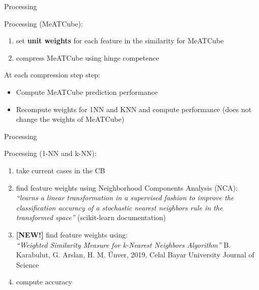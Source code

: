 \documentclass[]{beamer}
\begin{document}
\begin{frame}{Processing}

    Processing (MeATCube):\begin{enumerate}
        \item set \textbf{unit weights} for each feature in the similarity for MeATCube
        \item compress MeATCube using hinge competence
    \end{enumerate}

    At each compression step step:
    \begin{itemize}
        \item Compute MeATCube prediction performance
        \item Recompute weights for 1NN and KNN and compute performance (does not change the weights of MeATCube)
    \end{itemize}

\end{frame}
\begin{frame}{Processing}

    Processing (1-NN and k-NN):\begin{enumerate}
        \item take current cases in the CB
        \item find feature weights using Neighborhood Components Analysis (NCA):\\
        \textit{``learns a linear transformation in a supervised fashion to improve the classification accuracy of a stochastic nearest neighbors rule in the transformed space''} (scikit-learn documentation)
        \item \textbf{[NEW!]} find feature weights using:\\
        \textit{``Weighted Similarity Measure for k-Nearest Neighbors Algorithm''}
        B. Karabulut, G. Arslan, H. M. Ünver, 2019, Celal Bayar University Journal of Science
    
        \item compute accuracy
    \end{enumerate}

\end{frame}
\end{document}
